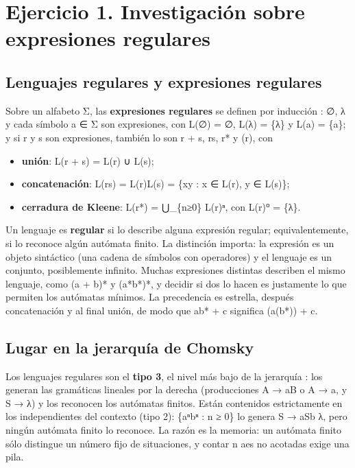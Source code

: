 \hypertarget{ejercicio-1.-investigaciuxf3n-sobre-expresiones-regulares}{%
\section{Ejercicio 1. Investigación sobre expresiones regulares}\label{ejercicio-1.-investigaciuxf3n-sobre-expresiones-regulares}}

\hypertarget{lenguajes-regulares-y-expresiones-regulares}{%
\subsection{Lenguajes regulares y expresiones regulares}\label{lenguajes-regulares-y-expresiones-regulares}}

Sobre un alfabeto Σ, las \textbf{expresiones regulares} se definen por inducción \autocite[sec.~3.1.2]{hopcroft2007}: ∅, λ y cada símbolo a ∈ Σ son expresiones, con L(∅) = ∅, L(λ) = \{λ\} y L(a) = \{a\}; y si r y s son expresiones, también lo son r + s, rs, r* y (r), con

\begin{itemize}
\tightlist
\item
  \textbf{unión}: L(r + s) = L(r) ∪ L(s);
\item
  \textbf{concatenación}: L(rs) = L(r)L(s) = \{xy : x ∈ L(r), y ∈ L(s)\};
\item
  \textbf{cerradura de Kleene}: L(r*) = ⋃\_\{n≥0\} L(r)ⁿ, con L(r)⁰ = \{λ\}.
\end{itemize}

Un lenguaje es \textbf{regular} si lo describe alguna expresión regular; equivalentemente, si lo reconoce algún autómata finito. La distinción importa: la expresión es un objeto sintáctico (una cadena de símbolos con operadores) y el lenguaje es un conjunto, posiblemente infinito. Muchas expresiones distintas describen el mismo lenguaje, como (a + b)* y (a*b*)*, y decidir si dos lo hacen es justamente lo que permiten los autómatas mínimos. La precedencia es estrella, después concatenación y al final unión, de modo que ab* + c significa (a(b*)) + c.

\hypertarget{lugar-en-la-jerarquuxeda-de-chomsky}{%
\subsection{Lugar en la jerarquía de Chomsky}\label{lugar-en-la-jerarquuxeda-de-chomsky}}

Los lenguajes regulares son el \textbf{tipo 3}, el nivel más bajo de la jerarquía \autocite{chomsky1956}: los generan las gramáticas lineales por la derecha (producciones A → aB o A → a, y S → λ) y los reconocen los autómatas finitos. Están contenidos estrictamente en los independientes del contexto (tipo 2): \{aⁿbⁿ : n ≥ 0\} lo genera S → aSb \textbar{} λ, pero ningún autómata finito lo reconoce. La razón es la memoria: un autómata finito sólo distingue un número fijo de situaciones, y contar n aes no acotadas exige una pila.


